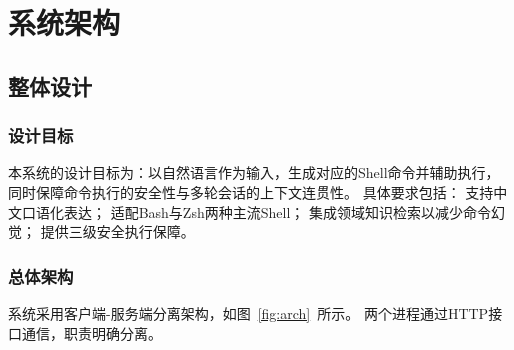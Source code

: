 \chapter{系统架构}

\section{整体设计}

\subsection{设计目标}

本系统的设计目标为：以自然语言作为输入，生成对应的Shell命令并辅助执行，
同时保障命令执行的安全性与多轮会话的上下文连贯性。
具体要求包括：
支持中文口语化表达；
适配Bash与Zsh两种主流Shell；
集成领域知识检索以减少命令幻觉；
提供三级安全执行保障。

\subsection{总体架构}

系统采用客户端-服务端分离架构，如图~\ref{fig:arch}~所示。
两个进程通过HTTP接口通信，职责明确分离。


